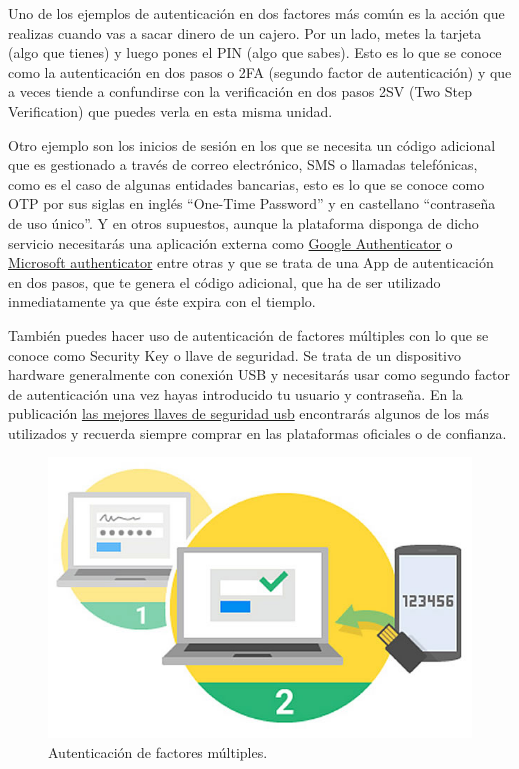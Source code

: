 \documentclass[
  spanish,
  a4paper,
  openany]{book}
\begin{document}
Uno de los ejemplos de autenticación en dos factores más común es la acción que realizas cuando vas a sacar dinero de un cajero. Por un lado, metes la tarjeta (algo que tienes) y luego pones el PIN (algo que sabes). Esto es lo que se conoce como la autenticación en dos pasos o 2FA (segundo factor de autenticación) y que a veces tiende a confundirse con la verificación en dos pasos 2SV (Two Step Verification) que puedes verla en esta misma unidad.

Otro ejemplo son los inicios de sesión en los que se necesita un código adicional que es gestionado a través de correo electrónico, SMS o llamadas telefónicas, como es el caso de algunas entidades bancarias, esto es lo que se conoce como OTP por sus siglas en inglés ``One-Time Password'' y en castellano ``contraseña de uso único''. Y en otros supuestos, aunque la plataforma disponga de dicho servicio necesitarás una aplicación externa como \href{https://support.google.com/accounts/answer/1066447?co=GENIE.Platform\%3DAndroid\&hl=es-419}{Google Authenticator} o \href{https://www.microsoft.com/es-es/account/authenticator}{Microsoft authenticator} entre otras y que se trata de una App de autenticación en dos pasos, que te genera el código adicional, que ha de ser utilizado inmediatamente ya que éste expira con el tiemplo.

También puedes hacer uso de autenticación de factores múltiples con lo que se conoce como Security Key o llave de seguridad. Se trata de un dispositivo hardware generalmente con conexión USB y necesitarás usar como segundo factor de autenticación una vez hayas introducido tu usuario y contraseña. En la publicación \href{https://es.digitaltrends.com/computadoras/las-mejores-llaves-de-seguridad-usb/}{las mejores llaves de seguridad usb} encontrarás algunos de los más utilizados y recuerda siempre comprar en las plataformas oficiales o de confianza.

\begin{figure}

{\centering \includegraphics[width=0.5\linewidth]{images/autenticación-factor-múltiple} 

}

\caption{Autenticación de factores múltiples.}\label{fig:unnamed-chunk-14}
\end{figure}
\end{document}
